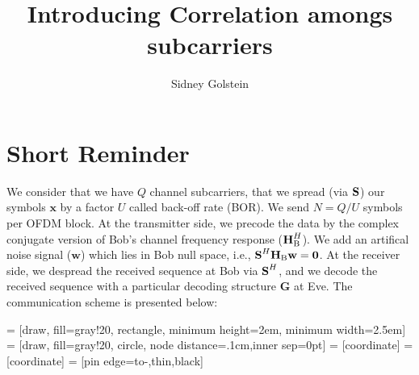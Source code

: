 \documentclass[12pt]{article}
\begin{document}
\title{\textbf{Introducing Correlation amongs subcarriers\\}}
\author{Sidney Golstein}
\maketitle



\section{Short Reminder}
We consider that we have $Q$ channel subcarriers, that we spread (via $\textbf{S}$) our symbols  $\textbf{x}$ by a factor $U$ called back-off rate (BOR). We send $N = Q/U$ symbols per OFDM block. At the transmitter side, we precode the data by the complex conjugate version of Bob's channel frequency response ($\textbf{H}_{\text{B}}^H$). We add an artifical noise signal ($\textbf{w}$) which lies in Bob null space, i.e., $\textbf{S}^H \textbf{H}_{\text{B}} \textbf{w} = \textbf{0}$. At the receiver side, we despread the received sequence at Bob via $\textbf{S}^H$, and we decode the received sequence with a particular decoding structure $\textbf{G}$ at Eve. The communication scheme is presented below:

 = [draw, fill=gray!20, rectangle, 
minimum height=2em, minimum width=2.5em]
 = [draw, fill=gray!20, circle, node distance=.1cm,inner sep=0pt]
 = [coordinate]
 = [coordinate]
 = [pin edge={to-,thin,black}]
\end{document}
